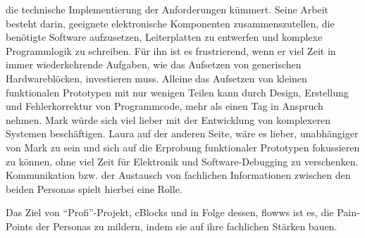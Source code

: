 die technische Implementierung der Anforderungen kümmert. Seine Arbeit besteht darin, geeignete elektronische Komponenten zusammenszutellen, die benötigte Software aufzusetzen, Leiterplatten zu entwerfen und komplexe Programmlogik zu schreiben. Für ihn ist es frustrierend, wenn er viel Zeit in immer wiederkehrende Aufgaben, wie das Aufsetzen von generischen Hardwareblöcken, investieren muss. Alleine das Aufsetzen von kleinen funktionalen Prototypen mit nur wenigen Teilen kann durch Design, Erstellung und Fehlerkorrektur von Programmcode, mehr als einen Tag in Anspruch nehmen. Mark würde sich viel lieber mit der Entwicklung von komplexeren Systemen beschäftigen. Laura auf der anderen Seite, wäre es lieber, unabhängiger von Mark zu sein und sich auf die Erprobung funktionaler Prototypen fokussieren zu können, ohne viel Zeit für Elektronik und Software-Debugging zu verschenken. Kommunikation bzw. der Austausch von fachlichen Informationen zwischen den beiden Personas spielt hierbei eine Rolle.

Das Ziel von "`Profi"'-Projekt, cBlocks und in Folge dessen, flowws ist es, die Pain-Points der Personas zu mildern, indem sie auf ihre fachlichen Stärken bauen. 